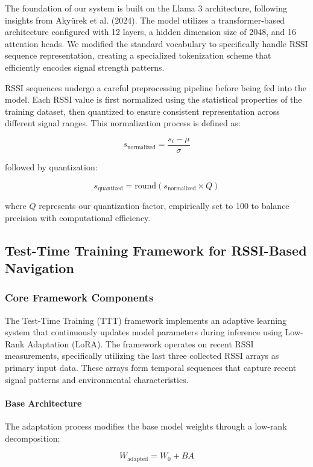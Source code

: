 \documentclass[12pt]{article}
\begin{document}
The foundation of our system is built on the Llama 3 architecture, following insights from Akyürek et al. (2024). The model utilizes a transformer-based architecture configured with 12 layers, a hidden dimension size of 2048, and 16 attention heads. We modified the standard vocabulary to specifically handle RSSI sequence representation, creating a specialized tokenization scheme that efficiently encodes signal strength patterns.

RSSI sequences undergo a careful preprocessing pipeline before being fed into the model. Each RSSI value is first normalized using the statistical properties of the training dataset, then quantized to ensure consistent representation across different signal ranges. This normalization process is defined as:

\[
s_{\text{normalized}} = \frac{s_i - \mu}{\sigma}
\]

followed by quantization:

\[
s_{\text{quantized}} = \text{round}(s_{\text{normalized}} \times Q)
\]

where $Q$ represents our quantization factor, empirically set to 100 to balance precision with computational efficiency.

\subsection{Test-Time Training Framework for RSSI-Based Navigation}

\subsubsection{Core Framework Components}

The Test-Time Training (TTT) framework implements an adaptive learning system that continuously updates model parameters during inference using Low-Rank Adaptation (LoRA). The framework operates on recent RSSI measurements, specifically utilizing the last three collected RSSI arrays as primary input data. These arrays form temporal sequences that capture recent signal patterns and environmental characteristics.

\paragraph{Base Architecture}

The adaptation process modifies the base model weights through a low-rank decomposition:

\[
W_{\text{adapted}} = W_0 + BA
\]
\end{document}
